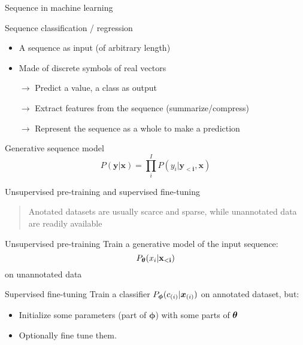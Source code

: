 \begin{frame}{Sequence in machine learning}
  \begin{block}{Sequence classification / regression}
    \begin{itemize}
    \item A sequence as input (of arbitrary length)
    \item Made of discrete symbols of real vectors 
    \item[$\rightarrow$] Predict a value, a class as output 
    \item[$\rightarrow$] Extract features from the sequence (summarize/compress)
    \item[$\rightarrow$] Represent the sequence as a whole to make a prediction
    \end{itemize}
  \end{block}
  \begin{block}{Generative sequence model}
    $$P( \mathbf{y} | \mathbf{x}) = \prod_i^I P( y_i |\mathbf{y_{<i}},\mathbf{x}) $$
  \end{block}
\end{frame}

\begin{frame}{Unsupervised pre-training and supervised fine-tuning}
  \begin{quote}
    Anotated datasets are usually scarce and sparse, while unannotated
    data are readily available
  \end{quote}
  \begin{block}{Unsupervised pre-training}
    Train a generative model of the input sequence: 
    $$P_{\boldsymbol{\theta}}( x_i |\mathbf{x_{<i}}) $$
    on unannotated data
  \end{block}
  \begin{block}{Supervised fine-tuning}
    Train a classifier $P_{\boldsymbol{\phi}} ({c}_{(i)} | \boldsymbol{x}_{(i)})$ on annotated dataset, but:
    \begin{itemize}
    \item Initialize some parameters (part of $\boldsymbol{\phi}$) with some parts of $\boldsymbol{\theta}$
    \item Optionally fine tune them. 
    \end{itemize}
  \end{block}

  
\end{frame}

